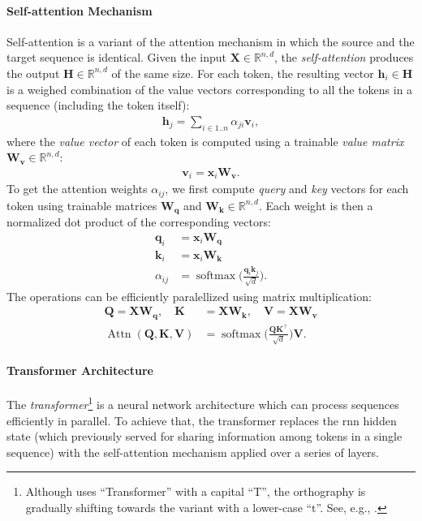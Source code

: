 {\paragraph{Self-attention Mechanism} Self-attention \cite{cheng2016long,vaswani2017attention} is a variant of the attention mechanism in which the source and the target sequence is identical. Given the input $\mathbf{X} \in \mathbb{R}^{n,d}$, the \emph{self-attention} produces the output $\mathbf{H} \in \mathbb{R}^{n,d}$ of the same size. For each token, the resulting vector $\mathbf{h}_i \in \mathbf{H}$ is a weighed combination of the value vectors corresponding to all the tokens in a sequence (including the token itself):
\begin{align}
    \mathbf{h}_j = \sum_{i\in 1..n} \alpha_{ji} \mathbf{v}_i,
\end{align}
where the \emph{value vector} of each token is computed using a trainable \emph{value matrix} $\mathbf{W_v} \in \mathbb{R}^{n,d}$:
\begin{align}
    \mathbf{v}_i = \mathbf{x}_i \mathbf{W_v}.
\end{align}
To get the attention weights $\alpha_{ij}$, we first compute \textit{query} and \textit{key} vectors for each token using trainable matrices $\mathbf{W_q}$ and $\mathbf{W_k} \in \mathbb{R}^{n,d}$. Each weight is then a normalized dot product of the corresponding vectors:
\begin{align}
    \mathbf{q}_i & = \mathbf{x}_i \mathbf{W_q}                                                      \\
    \mathbf{k}_i & = \mathbf{x}_i \mathbf{W_k}                                                      \\
    \alpha_{ij}  & = \operatorname{softmax}\biggl(\frac{\mathbf{q}_i\mathbf{k}_j}{\sqrt{d}}\biggr).
\end{align}
The operations can be efficiently paralellized using matrix multiplication:
\begin{align}
    \mathbf{Q}                                             = \mathbf{X}\mathbf{W_q},\quad\mathbf{K} & = \mathbf{X}\mathbf{W_k},\quad\mathbf{V} = \mathbf{X}\mathbf{W_v}                           \\
    \operatorname{Attn}(\mathbf{Q}, \mathbf{K}, \mathbf{V})                                         & = \operatorname{softmax}\biggl(\frac{\mathbf{Q}\mathbf{K}^\top}{\sqrt{d}}\biggr)\mathbf{V}.
\end{align}


\paragraph{Transformer Architecture} The \emph{transformer}\footnote{Although \citet{vaswani2017attention} uses ``Transformer'' with a capital ``T'', the orthography is gradually shifting towards the variant with a lower-case ``t''. See, e.g., \citet[p.~215]{jurafsky2024}.} \cite{vaswani2017attention} is a neural network architecture which can process sequences efficiently in parallel. To achieve that, the transformer replaces the \ac{rnn} hidden state (which previously served for sharing information among tokens in a single sequence) with the self-attention mechanism applied over a series of layers.

}
